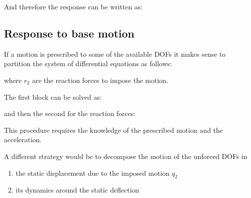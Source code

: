 \documentclass[10pt,a4paper]{scrartcl}
\begin{document}
\begin{multicols*}{2}
And therefore the response can be written as:


\subsection{Response to base motion}

If a motion is prescribed to some of the available DOFs it makes sense to partition the system of differential equations as follows:


where $r_2$ are the reaction forces to impose the motion.

The first block can be solved as:


and then the second for the reaction forces:


This procedure requires the knowledge of the prescribed motion and the acceleration.

A different strategy would be to decompose the motion of the unforced DOFs in

\begin{enumerate}
\item the static displacement due to the imposed motion $q_2$
\item its dynamics around the static deflection
\end{enumerate}


\end{multicols*}
\end{document}
